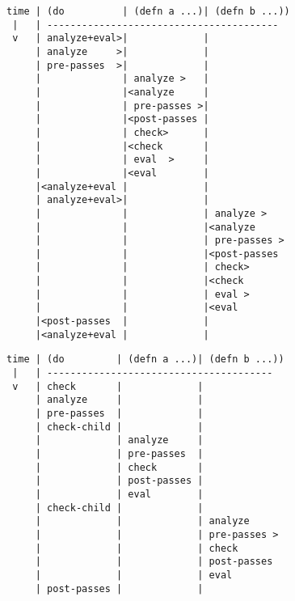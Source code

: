 \begin{figure*}
\singlespacing
\begin{verbatim}
time | (do          | (defn a ...)| (defn b ...))
 |   | ----------------------------------------
 v   | analyze+eval>|             |
     | analyze     >|             |
     | pre-passes  >|             |
     |              | analyze >   |
     |              |<analyze     |
     |              | pre-passes >|
     |              |<post-passes |
     |              | check>      |
     |              |<check       |
     |              | eval  >     |
     |              |<eval        |
     |<analyze+eval |             |
     | analyze+eval>|             |
     |              |             | analyze >   
     |              |             |<analyze     
     |              |             | pre-passes >
     |              |             |<post-passes 
     |              |             | check>      
     |              |             |<check       
     |              |             | eval >
     |              |             |<eval
     |<post-passes  |             |
     |<analyze+eval |             |
\end{verbatim}
  \caption{}
  \label{fig:analyzer:control-flow-pre-expand-side-effects}
\end{figure*}

\begin{figure*}
\singlespacing
\begin{verbatim}
time | (do         | (defn a ...)| (defn b ...))
 |   | ---------------------------------------
 v   | check       |             |
     | analyze     |             |
     | pre-passes  |             |
     | check-child |             |
     |             | analyze     |
     |             | pre-passes  |
     |             | check       |
     |             | post-passes |
     |             | eval        |
     | check-child |             |
     |             |             | analyze
     |             |             | pre-passes >
     |             |             | check
     |             |             | post-passes
     |             |             | eval
     | post-passes |             |
\end{verbatim}
  \caption{}
  \label{fig:analyzer:control-flow-incremental-side-effects}
\end{figure*}
